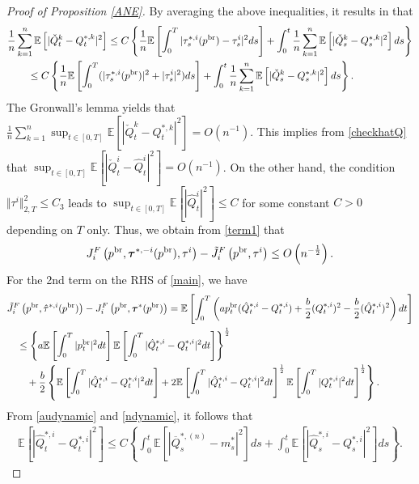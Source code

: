 \documentclass[11pt]{article}
\numberwithin{equation}{section}
\begin{document}
\begin{proof}[Proof of Proposition \ref{ANE}]
By averaging the above inequalities, it results in that
\begin{align*}
&\frac{1}{n}\sum_{k=1}^n\mathbb{E}\left[|\check{Q}_t^k-Q_t^{*,k}|^2\right]\leq C\left\{\frac{1}{n}\mathbb{E}\left[\int_0^T|\tau_s^{*,i}(p^{{\rm br}})-\tau_s^i|^2ds\right]+\int_0^t\frac{1}{n}\sum_{k=1}^n\mathbb{E}\left[|\check{Q}_s^k-Q_s^{*,k}|^2\right]ds\right\}\nonumber\\
&\qquad\leq C\left\{\frac{1}{n}\mathbb{E}\left[\int_0^T(|\tau_s^{*,i}(p^{{\rm br}})|^2+|\tau_s^i|^2)ds\right]+\int_0^t\frac{1}{n}\sum_{k=1}^n\mathbb{E}\left[|\check{Q}_s^k-Q_s^{*,k}|^2\right]ds\right\}.
\end{align*}
The Gronwall's lemma yields that
$\frac{1}{n}\sum_{k=1}^n\sup_{t\in [0,T]}\mathbb{E}\left[\left|\check{Q}_t^k-Q_t^{*,k}\right|^2\right]=O\left(n^{-1}\right).$
This implies from \eqref{checkhatQ} that $\sup_{t\in [0,T]}\mathbb{E}\left[|\check{Q}_t^i-\hat{Q}_t^i|^2\right]=O(n^{-1})$. On the other hand, the condition $\Vert \tau^i\Vert_{2, T}^2\leq C_3$ leads to $\sup_{t\in [0,T]}\mathbb{E}[|\hat{Q}_t^i|^2]\leq C$ for some constant $C>0$ depending on $T$ only.  Thus, we obtain from \eqref{term1} that
\begin{align}\label{result1}
J_i^F\left(p^{{\rm br}},\boldsymbol{\tau}^{*,-i}(p^{{\rm br}}), \tau^i\right)-\tilde{J}_i^F\left(p^{{\rm br}}, \tau^i\right)\leq O\left(n^{-\frac{1}{2}}\right).
\end{align}
For the 2nd term on the RHS of \eqref{main}, we have
\begin{align*}
&\tilde{J}_i^F\left(p^{{\rm br}}, \hat{\tau}^{*,i}(p^{{\rm br}})\right)-J_i^F\left(p^{{\rm br}},\boldsymbol{\tau}^*(p^{{\rm br}})\right)=\mathbb{E}\left[\int_0^T\left(ap_t^{{\rm br}}(\hat{Q}_t^{*,i}-Q_t^{*,i})+\frac{b}{2}(Q_t^{*,i})^2-\frac{b}{2}(\hat{Q}_t^{*,i})^2\right)dt\right]\\
&\quad\leq\left\{a\mathbb{E}\left[\int_0^T|p_t^{{\rm br}}|^2dt\right]\mathbb{E}\left[\int_0^T|\hat{Q}_t^{*,i}-Q_t^{*,i}|^2dt\right]\right\}^{\frac{1}{2}}\\
&\qquad+\frac{b}{2}\left\{\mathbb{E}\left[\int_0^T|\hat{Q}_t^{*,i}-Q_t^{*,i}|^2dt\right]+2\mathbb{E}\left[\int_0^T|\hat{Q}_t^{*,i}-Q_t^{*,i}|^2dt\right]^{\frac{1}{2}}\mathbb{E}\left[\int_0^T|Q_t^{*,i}|^2dt\right]^{\frac{1}{2}}\right\}.
\end{align*}
From \eqref{audynamic} and \eqref{ndynamic}, it follows that 
\begin{align}\label{eqdifference}
\mathbb{E}\left[\left|\hat{Q}_t^{*,i}-Q_t^{*,i}\right|^2\right]\leq C\left\{\int_0^t\mathbb{E}\left[\left|\overline{Q}_s^{*,(n)}-m_s^*\right|^2\right]ds+\int_0^t\mathbb{E}\left[\left|\hat{Q}_s^{*,i}-Q_s^{*,i}\right|^2\right]ds\right\}.

\end{align}
\end{proof}
\end{document}
